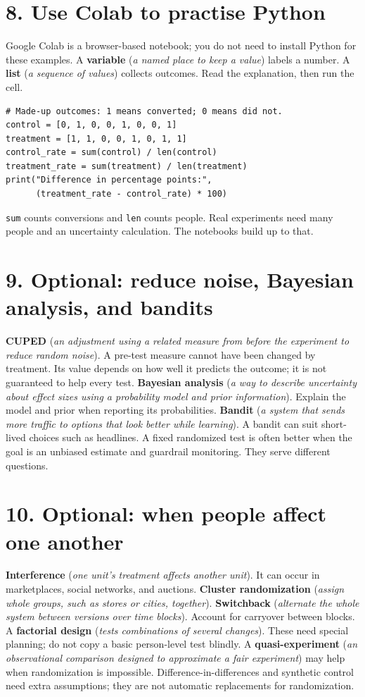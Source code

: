 \documentclass[11pt,a4paper]{article}
\newcommand{\plainterm}[2]{\textbf{#1} (\emph{#2})}
\begin{document}
\section{8. Use Colab to practise Python}
Google Colab is a browser-based notebook; you do not need to install Python for these examples. A \plainterm{variable}{a named place to keep a value} labels a number. A \plainterm{list}{a sequence of values} collects outcomes. Read the explanation, then run the cell.
\begin{lstlisting}
# Made-up outcomes: 1 means converted; 0 means did not.
control = [0, 1, 0, 0, 1, 0, 0, 1]
treatment = [1, 1, 0, 0, 1, 0, 1, 1]
control_rate = sum(control) / len(control)
treatment_rate = sum(treatment) / len(treatment)
print("Difference in percentage points:",
      (treatment_rate - control_rate) * 100)
\end{lstlisting}
\texttt{sum} counts conversions and \texttt{len} counts people. Real experiments need many people and an uncertainty calculation. The notebooks build up to that.

\section{9. Optional: reduce noise, Bayesian analysis, and bandits}
\plainterm{CUPED}{an adjustment using a related measure from before the experiment to reduce random noise}. A pre-test measure cannot have been changed by treatment. Its value depends on how well it predicts the outcome; it is not guaranteed to help every test.
\plainterm{Bayesian analysis}{a way to describe uncertainty about effect sizes using a probability model and prior information}. Explain the model and prior when reporting its probabilities.
\plainterm{Bandit}{a system that sends more traffic to options that look better while learning}. A bandit can suit short-lived choices such as headlines. A fixed randomized test is often better when the goal is an unbiased estimate and guardrail monitoring. They serve different questions.

\section{10. Optional: when people affect one another}
\plainterm{Interference}{one unit's treatment affects another unit}. It can occur in marketplaces, social networks, and auctions.
\plainterm{Cluster randomization}{assign whole groups, such as stores or cities, together}. \plainterm{Switchback}{alternate the whole system between versions over time blocks}. Account for carryover between blocks. A \plainterm{factorial design}{tests combinations of several changes}. These need special planning; do not copy a basic person-level test blindly.
A \plainterm{quasi-experiment}{an observational comparison designed to approximate a fair experiment} may help when randomization is impossible. Difference-in-differences and synthetic control need extra assumptions; they are not automatic replacements for randomization.
\end{document}
